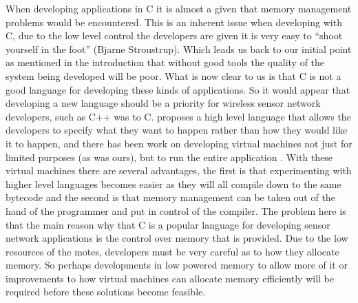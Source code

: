When developing applications in C it is almost a given that memory management problems would be encountered. This is an inherent issue when developing with C, due to the low level control the developers are given it is very easy to ``shoot yourself in the foot'' (Bjarne Stroustrup). Which leads us back to our initial point as mentioned in the introduction that without good tools the quality of the system being developed will be poor. What is now clear to us is that C is not a good language for developing these kinds of applications. So it would appear that developing a new language should be a priority for wireless sensor network developers, such as C++ was to C. \cite{1281625} proposes a high level language that allows the developers to specify what they want to happen rather than how they would like it to happen, and there has been work on developing virtual machines not just for limited purposes (as was ours), but to run the entire application \cite{Levis:2002:MTV:635508.605407,Muller:2007:VMS:1272998.1273013}. With these virtual machines there are several advantages, the first is that experimenting with higher level languages becomes easier as they will all compile down to the same bytecode and the second is that memory management can be taken out of the hand of the programmer and put in control of the compiler. The problem here is that the main reason why that C is a popular language for developing sensor network applications is the control over memory that is provided. Due to the low resources of the motes, developers must be very careful as to how they allocate memory. So perhaps developments in low powered memory to allow more of it or improvements to how virtual machines can allocate memory efficiently will be required before these solutions become feasible.





